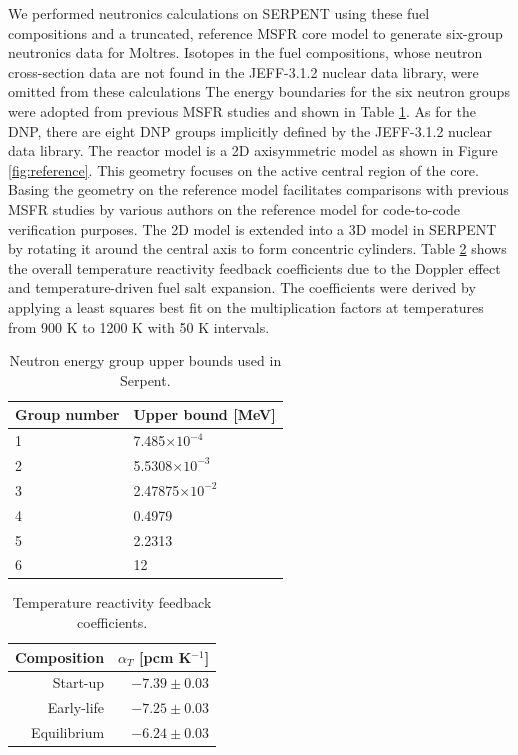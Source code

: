 \documentclass{anstrans}
\begin{document}
	We performed neutronics calculations on SERPENT using these fuel
	compositions and a truncated, reference \gls{MSFR} core model
	\cite{pettersen_coupled_2016} to generate six-group neutronics data for
	Moltres. Isotopes in the fuel compositions, whose
	neutron cross-section data are not found in the
	JEFF-3.1.2 nuclear data library, were omitted from these calculations
	The energy boundaries for the six neutron groups were adopted from previous
	\gls{MSFR} studies and shown in Table \ref{table:bound}.
	As for the \gls{DNP}, there are eight \gls{DNP} groups implicitly defined
	by the JEFF-3.1.2 nuclear data library.
	The reactor model is a 2D axisymmetric model as shown in
	Figure \ref{fig:reference}. This geometry focuses on the active central
	region of the core. Basing the geometry on the reference model facilitates
	comparisons with previous MSFR studies by various authors
	\cite{fiorina_modelling_2014} \cite{pettersen_coupled_2016} on the
	reference model for code-to-code verification purposes.
	The 2D model is extended into a 3D model in SERPENT by rotating it
	around the central axis to form concentric cylinders. Table
	\ref{table:reactivity} shows the overall temperature reactivity feedback
	coefficients due to the Doppler effect and
	temperature-driven fuel salt expansion. The coefficients were derived by
	applying a least squares best fit on the multiplication factors at
	temperatures from 900 K to 1200 K with 50 K intervals.
	
\begin{table}[t]
	\centering
	\captionsetup{justification=centering}
	\caption{Neutron energy group upper bounds used in Serpent.}
	\begin{tabular}{ll}
		\hline
		{Group number} & {Upper bound [MeV]}\\
		\hline
		1 & 7.485$\times 10^{-4}$\\
		2 & 5.5308$\times 10^{-3}$\\
		3 & 2.47875$\times 10^{-2}$\\
		4 & 0.4979\\
		5 & 2.2313\\
		6 & 12\\
		\hline
	\end{tabular}
	\label{table:bound}
\end{table}
%
\begin{table}[t]
	\centering
	\captionsetup{justification=centering}
	\caption{Temperature reactivity feedback coefficients.}
	\begin{tabular}{rr}
		\hline
		{Composition} & {$\alpha_T$ [pcm K$^{-1}$]}\\
		\hline
		Start-up & $-7.39 \pm 0.03$\\
		Early-life & $-7.25 \pm 0.03$\\
		Equilibrium & $-6.24 \pm 0.03$\\
		\hline
	\end{tabular}
	\label{table:reactivity}
\end{table}	
	
\end{document}

